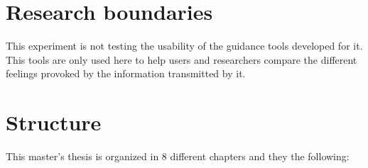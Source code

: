 \section{Research boundaries}


This experiment is not testing the usability of the guidance tools developed for it. This tools are only used here to help users and researchers compare the different feelings provoked by the information transmitted by it.


\section{Structure}

This master's thesis is organized in 8 different chapters and they the following:

